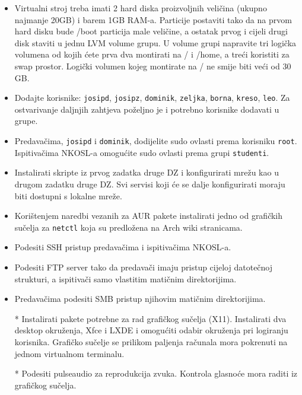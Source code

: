 \documentclass[12pt,a4paper]{article}
\begin{document}
	\hfill
	\hfill
	\begin{itemize}
		\item Virtualni stroj treba imati 2 hard diska proizvoljnih veličina (ukupno najmanje 20GB) i barem 1GB RAM-a. Particije postaviti tako da na prvom hard disku bude /boot particija male veličine, a ostatak prvog i cijeli drugi disk staviti u jednu LVM volume grupu. U volume grupi napravite tri logička volumena od kojih ćete prva dva montirati na / i /home, a treći koristiti za swap prostor. Logički volumen kojeg montirate na / ne smije biti veći od 30 GB.
  		
  		\item Dodajte korisnike: \texttt{josipd}, \texttt{josipz}, \texttt{dominik}, \texttt{zeljka}, \texttt{borna}, \texttt{kreso}, \texttt{leo}. Za ostvarivanje daljnjih zahtjeva poželjno je i potrebno korisnike dodavati u grupe.
  		
  		\item Predavačima, \texttt{josipd} i \texttt{dominik}, dodijelite sudo ovlasti prema korisniku \texttt{root}. Ispitivačima NKOSL-a omogućite sudo ovlasti prema grupi \texttt{studenti}.
  		
  		\item Instalirati skripte iz prvog zadatka druge DZ i konfigurirati mrežu kao u drugom zadatku druge DZ. Svi servisi koji će se dalje konfigurirati moraju biti dostupni s lokalne mreže.
  		
  		\item Korištenjem naredbi vezanih za AUR pakete instalirati jedno od grafičkih sučelja za \texttt{netctl} koja su predložena na Arch wiki stranicama.
  		
  		\item Podesiti SSH pristup predavačima i ispitivačima NKOSL-a.
  		
  		\item Podesiti FTP server tako da predavači imaju pristup cijeloj datotečnoj strukturi, a ispitivači samo vlastitim matičnim direktorijima.
  		
  		\item Predavačima podesiti SMB pristup njihovim matičnim direktorijima.
  		
  		\item[*] Instalirati pakete potrebne za rad grafičkog sučelja (X11). Instalirati dva desktop okruženja, Xfce i LXDE i omogućiti odabir okruženja pri logiranju korisnika. Grafičko sučelje se prilikom paljenja računala mora pokrenuti na jednom virtualnom terminalu.
  		
  		\item[*] Podesiti pulseaudio za reprodukcija zvuka. Kontrola glasnoće mora raditi iz grafičkog sučelja.
  	\end{itemize}
\end{document}
